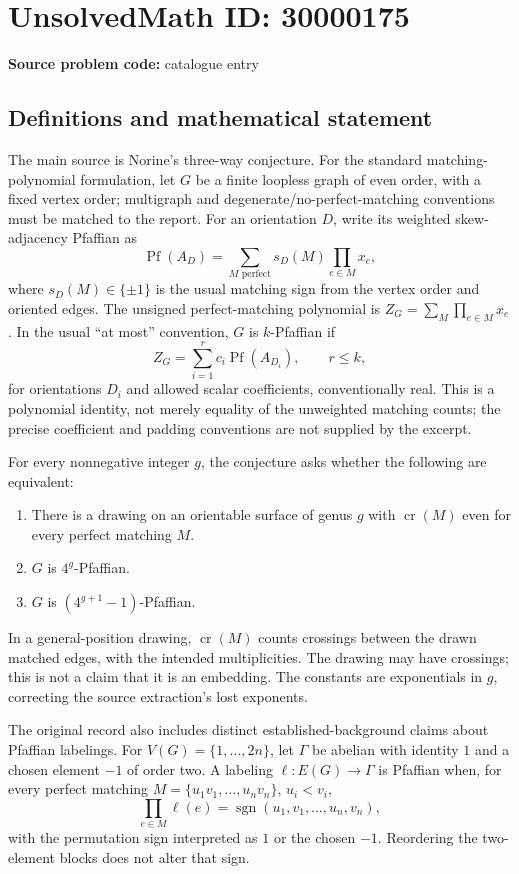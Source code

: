 \documentclass[11pt]{article}
\begin{document}
\section*{UnsolvedMath ID: 30000175}
\textbf{Source problem code:} catalogue entry
\subsection{Definitions and mathematical statement}
The main source is Norine's three-way conjecture. For the standard matching-polynomial formulation, let \(G\) be a finite loopless graph of even order, with a fixed vertex order; multigraph and degenerate/no-perfect-matching conventions must be matched to the report. For an orientation \(D\), write its weighted skew-adjacency Pfaffian as
\[
 \operatorname{Pf}(A_D)=\sum_{M\text{ perfect}}s_D(M)\prod_{e\in M}x_e,
\]
where \(s_D(M)\in\{\pm1\}\) is the usual matching sign from the vertex order and oriented edges. The unsigned perfect-matching polynomial is \(Z_G=\sum_M\prod_{e\in M}x_e\). In the usual ``at most'' convention, \(G\) is \(k\)-Pfaffian if
\[
 Z_G=\sum_{i=1}^{r}c_i\operatorname{Pf}(A_{D_i}),\qquad r\leq k,
\]
for orientations \(D_i\) and allowed scalar coefficients, conventionally real. This is a polynomial identity, not merely equality of the unweighted matching counts; the precise coefficient and padding conventions are not supplied by the excerpt.

For every nonnegative integer \(g\), the conjecture asks whether the following are equivalent:
\begin{enumerate}
\item There is a drawing on an orientable surface of genus \(g\) with \(\operatorname{cr}(M)\) even for every perfect matching \(M\).
\item \(G\) is \(4^g\)-Pfaffian.
\item \(G\) is \((4^{g+1}-1)\)-Pfaffian.
\end{enumerate}
In a general-position drawing, \(\operatorname{cr}(M)\) counts crossings between the drawn matched edges, with the intended multiplicities. The drawing may have crossings; this is not a claim that it is an embedding. The constants are exponentials in \(g\), correcting the source extraction's lost exponents.

The original record also includes distinct established-background claims about Pfaffian labelings. For \(V(G)=\{1,\ldots,2n\}\), let \(\Gamma\) be abelian with identity \(1\) and a chosen element \(-1\) of order two. A labeling \(\ell:E(G)\to\Gamma\) is Pfaffian when, for every perfect matching \(M=\{u_1v_1,\ldots,u_nv_n\}\), \(u_i<v_i\),
\[
 \prod_{e\in M}\ell(e)
 =\operatorname{sgn}(u_1,v_1,\ldots,u_n,v_n),
\]
with the permutation sign interpreted as \(1\) or the chosen \(-1\). Reordering the two-element blocks does not alter that sign.
\end{document}
